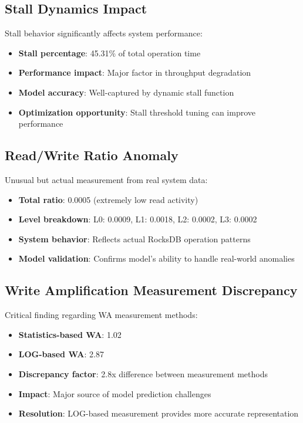 \documentclass[11pt]{article}
\begin{document}
\subsection{Stall Dynamics Impact}

Stall behavior significantly affects system performance:
\begin{itemize}
    \item \textbf{Stall percentage}: 45.31\% of total operation time
    \item \textbf{Performance impact}: Major factor in throughput degradation
    \item \textbf{Model accuracy}: Well-captured by dynamic stall function
    \item \textbf{Optimization opportunity}: Stall threshold tuning can improve performance
\end{itemize}

\subsection{Read/Write Ratio Anomaly}

Unusual but actual measurement from real system data:
\begin{itemize}
    \item \textbf{Total ratio}: 0.0005 (extremely low read activity)
    \item \textbf{Level breakdown}: L0: 0.0009, L1: 0.0018, L2: 0.0002, L3: 0.0002
    \item \textbf{System behavior}: Reflects actual RocksDB operation patterns
    \item \textbf{Model validation}: Confirms model's ability to handle real-world anomalies
\end{itemize}

\subsection{Write Amplification Measurement Discrepancy}

Critical finding regarding WA measurement methods:
\begin{itemize}
    \item \textbf{Statistics-based WA}: 1.02
    \item \textbf{LOG-based WA}: 2.87
    \item \textbf{Discrepancy factor}: 2.8x difference between measurement methods
    \item \textbf{Impact}: Major source of model prediction challenges
    \item \textbf{Resolution}: LOG-based measurement provides more accurate representation
\end{itemize}
\end{document}
